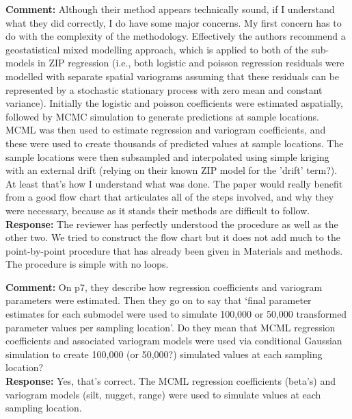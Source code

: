 \documentclass{letter}
\begin{document}
\begin{letter}
\textbf{Comment:} 
Although their method appears technically sound, if I understand what they did correctly, I do have some major concerns. My first concern has to do with the complexity of the methodology. Effectively the authors recommend a geostatistical mixed modelling approach, which is applied to both of the sub-models in ZIP regression (i.e., both logistic and poisson regression residuals were modelled with separate spatial variograms assuming that these residuals can be represented by a stochastic stationary process with zero mean and constant variance). Initially the logistic and poisson coefficients were estimated aspatially, followed by MCMC simulation to generate predictions at sample locations. MCML was then used to estimate regression and variogram coefficients, and these were used to create thousands of predicted values at sample locations. The sample locations were then subsampled and interpolated using simple kriging with an external drift (relying on their known ZIP model for the 'drift' term?).  At least that's how I understand what was done. The paper would really benefit from a good flow chart that articulates all of the steps involved, and why they were necessary, because as it stands their methods are difficult to follow.\\
\textbf{Response:}
The reviewer has perfectly understood the procedure as well as the other two. We tried to construct the flow chart but it does not add much to the point-by-point procedure that has already been given in Materials and methods. The procedure is simple with no loops.

\textbf{Comment:} 
On p7, they describe how regression coefficients and variogram parameters were estimated. Then they go on to say that `final parameter estimates for each submodel were used to simulate 100,000 or 50,000 transformed parameter values per sampling location'. Do they mean that MCML regression coefficients and associated variogram models were used via conditional Gaussian simulation to create 100,000 (or 50,000?) simulated values at each sampling location?  \\
\textbf{Response:} Yes, that's correct. The MCML regression coefficients (beta's) and variogram models (silt, nugget, range) were used to simulate values at each sampling location. 


\end{letter}
\end{document}
